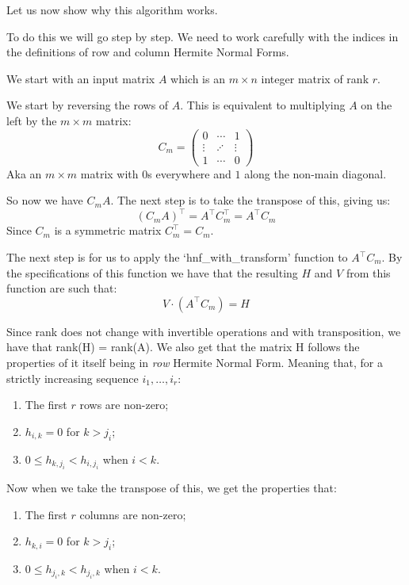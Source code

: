 \documentclass[oneside, a4paper, onecolumn, 11pt]{article}
\begin{document}
Let us now show why this algorithm works.

To do this we will go step by step. We need to work carefully with the indices in the definitions of row and column Hermite Normal Forms.

We start with an input matrix \(A\) which is an \(m \times n\) integer matrix of rank \(r\).

We start by reversing the rows of \(A\). This is equivalent to multiplying \(A\) on the left by the \(m \times m\) matrix:
\[
    C_m = \begin{pmatrix}
        0      & \cdots  & 1      \\
        \vdots & \iddots & \vdots \\
        1      & \cdots  & 0
    \end{pmatrix}
\]
Aka an \(m \times m\) matrix with \(0\)s everywhere and \(1\) along the non-main diagonal.

So now we have \(C_m A\). The next step is to take the transpose of this, giving us:
\[
    (C_m A)^\intercal = A^\intercal C_m^\intercal = A^\intercal C_m
\]
Since \(C_m\) is a symmetric matrix \(C_m^\intercal = C_m\).

The next step is for us to apply the `hnf\_with\_transform' function to \(A^\intercal C_m\). By the specifications of this function we have that the resulting \(H\) and \(V\) from this function are such that:
\[
    V \cdot (A^\intercal C_m) = H
\]

Since rank does not change with invertible operations and with transposition, we have that rank(H) = rank(A). We also get that the matrix H follows the properties of it itself being in \textit{row} Hermite Normal Form. Meaning that, for a strictly increasing sequence \(i_1, \dots, i_r\):
\begin{enumerate}[label=(\roman*)]
    \item The first \(r\) rows are non-zero;
    \item \(h_{i, k} = 0\) for \(k > j_i\);
    \item \(0 \le h_{k, j_i} < h_{i, j_i}\) when \(i < k\).
\end{enumerate}

Now when we take the transpose of this, we get the properties that:
\begin{enumerate}[label=(\roman*)]
    \item The first \(r\) columns are non-zero;
    \item \(h_{k, i} = 0\) for \(k > j_i\);
    \item \(0 \le h_{j_i, k} < h_{j_i, k}\) when \(i < k\). %
\end{enumerate}
\end{document}

